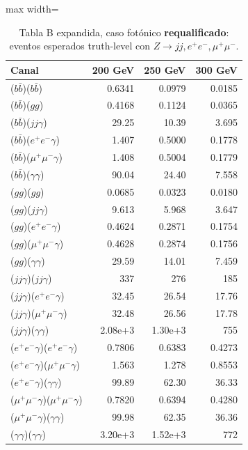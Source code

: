 \begin{table}[H]
\centering
\scriptsize
\caption{Tabla B expandida, caso fot\'onico \textbf{requalificado}: eventos esperados truth-level con $Z\to jj,e^+e^-,\mu^+\mu^-$.}
\label{tab:B_fotonico_requal}
\begin{adjustbox}{max width=\textwidth}
\begin{tabular}{lrrr}
\toprule
Canal & 200 GeV & 250 GeV & 300 GeV \\
\midrule
($b\bar b$)($b\bar b$) & 0.6341 & 0.0979 & 0.0185 \\
($b\bar b$)($gg$) & 0.4168 & 0.1124 & 0.0365 \\
($b\bar b$)($jj\gamma$) & 29.25 & 10.39 & 3.695 \\
($b\bar b$)($e^+e^-\gamma$) & 1.407 & 0.5000 & 0.1778 \\
($b\bar b$)($\mu^+\mu^-\gamma$) & 1.408 & 0.5004 & 0.1779 \\
($b\bar b$)($\gamma\gamma$) & 90.04 & 24.40 & 7.558 \\
($gg$)($gg$) & 0.0685 & 0.0323 & 0.0180 \\
($gg$)($jj\gamma$) & 9.613 & 5.968 & 3.647 \\
($gg$)($e^+e^-\gamma$) & 0.4624 & 0.2871 & 0.1754 \\
($gg$)($\mu^+\mu^-\gamma$) & 0.4628 & 0.2874 & 0.1756 \\
($gg$)($\gamma\gamma$) & 29.59 & 14.01 & 7.459 \\
($jj\gamma$)($jj\gamma$) & 337 & 276 & 185 \\
($jj\gamma$)($e^+e^-\gamma$) & 32.45 & 26.54 & 17.76 \\
($jj\gamma$)($\mu^+\mu^-\gamma$) & 32.48 & 26.56 & 17.78 \\
($jj\gamma$)($\gamma\gamma$) & 2.08e+3 & 1.30e+3 & 755 \\
($e^+e^-\gamma$)($e^+e^-\gamma$) & 0.7806 & 0.6383 & 0.4273 \\
($e^+e^-\gamma$)($\mu^+\mu^-\gamma$) & 1.563 & 1.278 & 0.8553 \\
($e^+e^-\gamma$)($\gamma\gamma$) & 99.89 & 62.30 & 36.33 \\
($\mu^+\mu^-\gamma$)($\mu^+\mu^-\gamma$) & 0.7820 & 0.6394 & 0.4280 \\
($\mu^+\mu^-\gamma$)($\gamma\gamma$) & 99.98 & 62.35 & 36.36 \\
($\gamma\gamma$)($\gamma\gamma$) & 3.20e+3 & 1.52e+3 & 772 \\
\bottomrule
\end{tabular}
\end{adjustbox}
\end{table}
